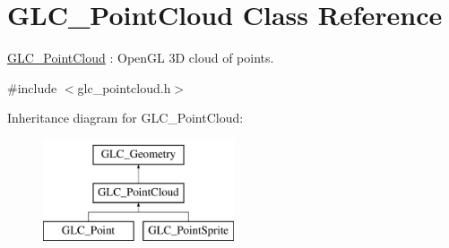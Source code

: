 \hypertarget{class_g_l_c___point_cloud}{\section{G\-L\-C\-\_\-\-Point\-Cloud Class Reference}
\label{class_g_l_c___point_cloud}
}


\hyperlink{class_g_l_c___point_cloud}{G\-L\-C\-\_\-\-Point\-Cloud} \-: Open\-G\-L 3\-D cloud of points.  




{\ttfamily \#include $<$glc\-\_\-pointcloud.\-h$>$}

Inheritance diagram for G\-L\-C\-\_\-\-Point\-Cloud\-:\begin{figure}[H]
\begin{center}
\leavevmode
\includegraphics[height=3.000000cm]{class_g_l_c___point_cloud}
\end{center}
\end{figure}
